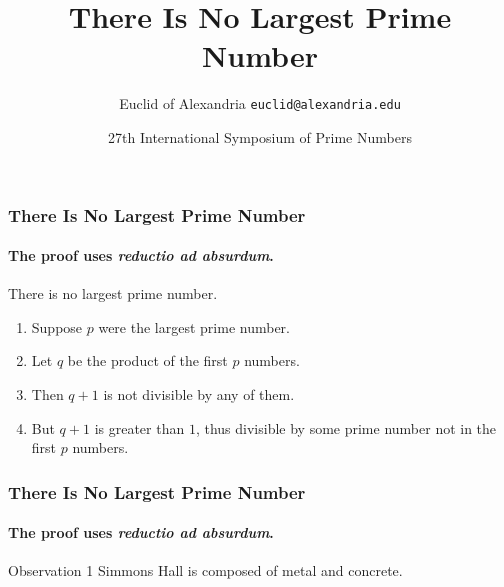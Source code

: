 \documentclass{beamer}
\title{There Is No Largest Prime Number}
\date[ISPN ’80]{27th International Symposium of Prime Numbers}
\author[Euclid]{Euclid of Alexandria \texttt{euclid@alexandria.edu}}
\begin{document}
\begin{frame}
\titlepage
\end{frame}


\begin{frame}
\frametitle{There Is No Largest Prime Number}
\framesubtitle{The proof uses \textit{reductio ad absurdum}.}
\begin{theorem}
There is no largest prime number. \end{theorem}
\begin{enumerate}
\item<1-| alert@1> Suppose $p$ were the largest prime number.
\item<2-> Let $q$ be the product of the first $p$ numbers.
\item<3-> Then $q+1$ is not divisible by any of them.
\item<1-> But $q + 1$ is greater than $1$, thus divisible by some prime
number not in the first $p$ numbers.
\end{enumerate}
\end{frame}

\begin{frame}
\frametitle{There Is No Largest Prime Number}
\framesubtitle{The proof uses \textit{reductio ad absurdum}.}
\begin{block}{Observation 1}
Simmons Hall is composed of metal and concrete.
\end{block}
\end{frame}
\end{document}

